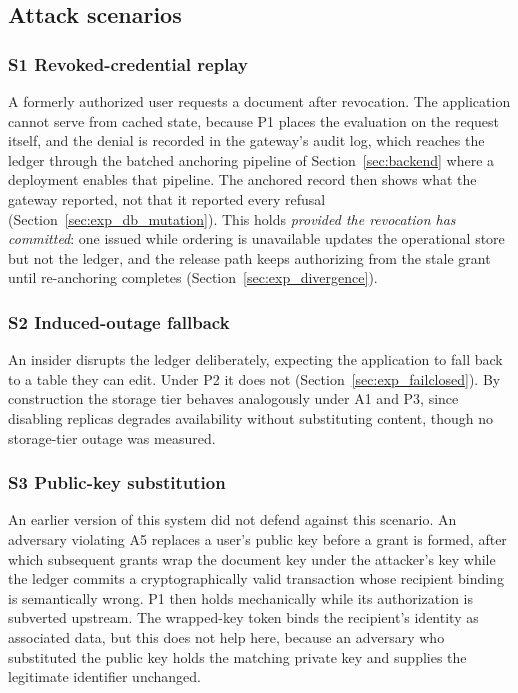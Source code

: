 \documentclass[preprint,12pt]{elsarticle}
\begin{document}
\subsection{Attack scenarios}
\label{sec:scenarios}

\subsubsection{S1 Revoked-credential replay}
A formerly authorized user requests a document after revocation. The application
cannot serve from cached state, because P1 places the evaluation on the request
itself, and the denial is recorded in the gateway's audit log, which reaches
the ledger through the batched anchoring pipeline of Section~\ref{sec:backend}
where a deployment enables that pipeline. The anchored record then shows what
the gateway reported, not that it reported every refusal
(Section~\ref{sec:exp_db_mutation}). This holds
\emph{provided the revocation has committed}: one issued while ordering is
unavailable updates the operational store but not the ledger, and the release
path keeps authorizing from the stale grant until re-anchoring completes
(Section~\ref{sec:exp_divergence}).

\subsubsection{S2 Induced-outage fallback}
An insider disrupts the ledger deliberately, expecting the application to
fall back to a table they can edit. Under P2 it does not
(Section~\ref{sec:exp_failclosed}). By construction the storage tier behaves
analogously under A1 and P3, since disabling replicas degrades availability
without substituting content, though no storage-tier outage was measured.

\subsubsection{S3 Public-key substitution}
\label{sc:s3}
An earlier version of this system did not defend against this scenario. An
adversary violating A5 replaces a user's public key before a grant is formed,
after which subsequent grants wrap the document key under the attacker's key
while the ledger commits a cryptographically valid transaction whose recipient
binding is semantically wrong. P1 then holds mechanically while its
authorization is subverted upstream. The wrapped-key token binds the
recipient's identity as associated data, but this does not help here, because
an adversary who substituted the public key holds the matching private key and
supplies the legitimate identifier unchanged.
\end{document}
